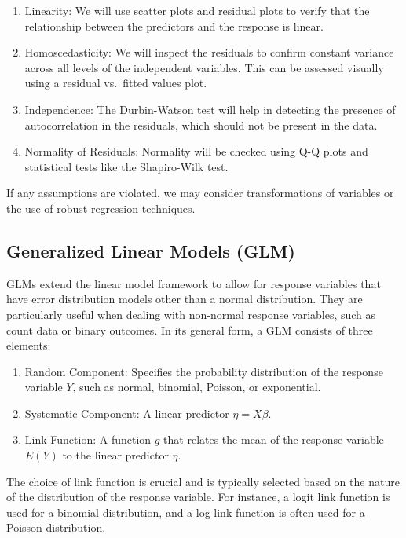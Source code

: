 \documentclass[
  super,
  preprint,
  3p]{elsarticle}
\providecommand{\tightlist}{%
  \setlength{\itemsep}{0pt}\setlength{\parskip}{0pt}}\usepackage{longtable,booktabs,array}
\begin{document}
\begin{enumerate}
\def\labelenumi{\arabic{enumi}.}
\tightlist
\item
  Linearity: We will use scatter plots and residual plots to verify that
  the relationship between the predictors and the response is linear.
\item
  Homoscedasticity: We will inspect the residuals to confirm constant
  variance across all levels of the independent variables. This can be
  assessed visually using a residual vs.~fitted values plot.
\item
  Independence: The Durbin-Watson test will help in detecting the
  presence of autocorrelation in the residuals, which should not be
  present in the data.
\item
  Normality of Residuals: Normality will be checked using Q-Q plots and
  statistical tests like the Shapiro-Wilk test.
\end{enumerate}

If any assumptions are violated, we may consider transformations of
variables or the use of robust regression techniques.

\hypertarget{generalized-linear-models-glm}{%
\subsection{Generalized Linear Models
(GLM)}\label{generalized-linear-models-glm}}

GLMs extend the linear model framework to allow for response variables
that have error distribution models other than a normal distribution.
They are particularly useful when dealing with non-normal response
variables, such as count data or binary outcomes. In its general form, a
GLM consists of three elements:

\begin{enumerate}
\def\labelenumi{\arabic{enumi}.}
\tightlist
\item
  Random Component: Specifies the probability distribution of the
  response variable \(Y\), such as normal, binomial, Poisson, or
  exponential.
\item
  Systematic Component: A linear predictor \(\eta = X\beta\).
\item
  Link Function: A function \(g\) that relates the mean of the response
  variable \(E(Y)\) to the linear predictor \(\eta\).
\end{enumerate}

The choice of link function is crucial and is typically selected based
on the nature of the distribution of the response variable. For
instance, a logit link function is used for a binomial distribution, and
a log link function is often used for a Poisson distribution.
\end{document}
